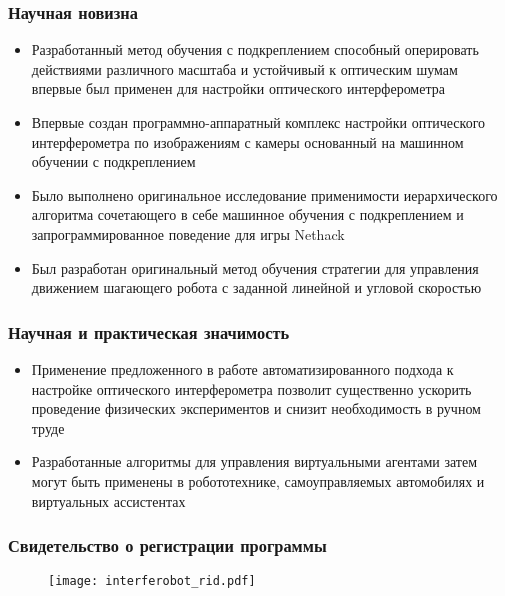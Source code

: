 \begin{frame}
    \frametitle{Научная новизна}
    \begin{itemize}
        \item Разработанный метод обучения с подкреплением способный оперировать действиями различного масштаба и устойчивый к оптическим шумам впервые был применен для настройки оптического интерферометра
        \item Впервые создан программно-аппаратный комплекс настройки оптического интерферометра по изображениям с камеры основанный на машинном обучении с подкреплением
        \item Было выполнено оригинальное исследование применимости иерархического алгоритма сочетающего в себе машинное обучения с подкреплением и запрограммированное поведение для игры Nethack
        \item Был разработан оригинальный метод обучения стратегии для управления движением шагающего робота с заданной линейной и угловой скоростью
    \end{itemize}
\end{frame}

\begin{frame}
    \frametitle{Научная и практическая значимость}
    \begin{itemize}
        \item Применение предложенного в работе автоматизированного подхода к настройке оптического интерферометра позволит существенно ускорить проведение физических экспериментов и снизит необходимость в ручном труде
        \item Разработанные алгоритмы для управления виртуальными агентами затем могут быть применены в робототехнике, самоуправляемых автомобилях и виртуальных ассистентах
    \end{itemize}
\end{frame}

\begin{frame}
    \frametitle{Свидетельство о регистрации программы}
    \begin{figure}[h]
        \centering
        \texttt{[image: interferobot\_rid.pdf]}
    \end{figure}
\end{frame}


